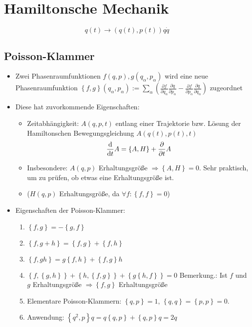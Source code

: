 \section{Hamiltonsche Mechanik}

$$
q(t) \rightarrow (q(t), p(t))
q\dot{q} 
$$

\subsection{Poisson-Klammer}
\begin{itemize}
\item Zwei Phasenraumfunktionen $f(q,p), g(q_\alpha,p_\alpha)$ wird
  eine neue Phasenraumfunktion
  $\left\{ f,g \right\}(q_\alpha,p_\alpha) := \sum\limits_\alpha
  \left( \frac{\partial f}{\partial q_\alpha}\frac{\partial
      q}{\partial p_\alpha} - \frac{\partial f}{\partial
      p_\alpha}\frac{\partial q}{\partial q_\alpha} \right)$
  zugeordnet

\item Diese hat zuvorkommende Eigenschaften:
\begin{itemize}
\item Zeitabhängigkeit: $A(q,p,t)$ entlang einer Trajektorie
  bzw. Lösung der Hamiltonschen Bewegungsgleichung $A(q(t),p(t),t)$
$$\frac{\text{d} }{\text{d} t} A = \left\{ A,H \right\} + \frac{\partial }{\partial t}A$$
\item Insbesondere: $A(q,p)$ Erhaltungsgröße
  $\Rightarrow \left\{ A,H \right\}=0$.  Sehr praktisch, um zu prüfen,
  ob etwas eine Erhaltungsgröße ist.

\item ($H(q,p)$ Erhaltungsgröße, da
  $\forall f:\left\{ f,f \right\}=0$)
\end{itemize}

\item Eigenschaften der Poisson-Klammer:
  \begin{enumerate}
  \item\label{item:1} $\left\{ f,g \right\}=-\left\{ g,f \right\}$
  \item\label{item:2}
    $\left\{ f,g+h \right\}=\left\{ f,g \right\}+\left\{ f,h \right\}$
  \item\label{item:3}
    $\left\{ f,gh \right\}=g\left\{ f,h \right\} + \left\{ f,g
    \right\}h$
  \item\label{item:4}
    $\left\{ f,\left\{ g,h \right\} \right\} + \left\{ h ,\left\{f,g
      \right\} \right\} + \left\{ g\left\{ h,f \right\} \right\} = 0$
    Bemerkung.: Ist $f$ und $g$ Erhaltungsgröße
    $\Rightarrow \left\{ f,g \right\}$ Erhaltungsgröße
  \item\label{item:5} Elementare Poisson-Klammern:
    $\left\{ q,p \right\} = 1$,
    $\left\{ q,q \right\}=\left\{ p,p \right\}=0$.

  \item\label{item:6} Anwendung:
    $\left\{ q^2,p \right\}q = q \left\{ q,p \right\} + \left\{ q,p
    \right\}q = 2q$
  \end{enumerate}

\end{itemize}


